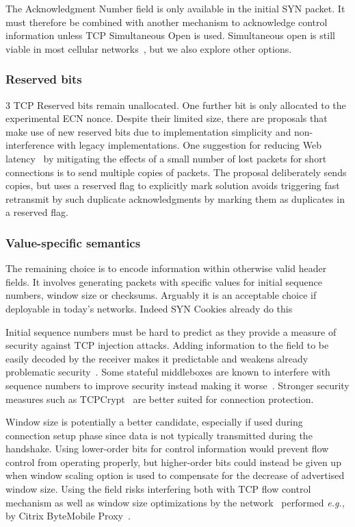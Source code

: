 \documentclass{sig-alternate-10pt}
\providecommand{\eg}{\emph{e.g.,} }
\begin{document}
The Acknowledgment Number field is only available in the initial SYN packet. It must therefore be combined with another mechanism to acknowledge control information unless TCP Simultaneous Open is used. Simultaneous open is still viable in most cellular networks~\cite{UntoldMiddlebox2011}, but we also explore other options.

\subsubsection*{Reserved bits}
\label{sec:reserved}

3 TCP Reserved bits remain unallocated. One further bit is only allocated to the experimental ECN nonce\cite{Ely:uc}. Despite their limited size, there are proposals that make use of new reserved bits due to implementation simplicity and non-interference with legacy implementations. One suggestion for reducing Web latency~\cite{Flach:2013uy} by mitigating the effects of a small number of lost packets for short connections is to send multiple copies of packets. The proposal deliberately sends copies, but uses a reserved flag to explicitly mark solution avoids triggering fast retransmit by such duplicate acknowledgments by marking them as duplicates in a reserved flag.

\subsubsection*{Value-specific semantics}

The remaining choice is to encode information within otherwise valid header fields. It involves generating packets with specific values for initial sequence numbers, window size or checksums. Arguably it is an acceptable choice if deployable in today's networks. Indeed SYN Cookies already do this~\cite{Eddy:2007to}

Initial sequence numbers must be hard to predict as they provide a measure of security against TCP injection attacks. Adding information to the field to be easily decoded by the receiver makes it predictable and weakens already problematic security~\cite{Bellovin:uz,Qian:2012wb}. Some stateful middleboxes are known to interfere with sequence numbers to improve security instead making it worse~\cite{Qian:2012bj}. Stronger security measures such as TCPCrypt~\cite{Mazieres:uz} are better suited for connection protection.

Window size is potentially a better candidate, especially if used during connection setup phase since data is not typically transmitted during the handshake. Using lower-order bits for control information would prevent flow control from operating properly, but higher-order bits could instead be given up when window scaling option is used to compensate for the decrease of advertised window size. Using the field risks interfering both with TCP flow control mechanism as well as window size optimizations by the network~\cite{Kopparty:2002ht,Chakravorty:2003dm} performed \eg by Citrix ByteMobile Proxy~\cite{Ha:2006td}. 
\end{document}
